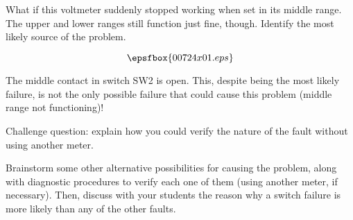 

What if this voltmeter suddenly stopped working when set in its middle range.  The upper and lower ranges still function just fine, though.  Identify the most likely source of the problem.

$$\epsfbox{00724x01.eps}$$







The middle contact in switch SW2 is open.  This, despite being the most likely failure, is not the only possible failure that could cause this problem (middle range not functioning)!

\vskip 10pt

Challenge question: explain how you could verify the nature of the fault without using another meter.







Brainstorm some other alternative possibilities for causing the problem, along with diagnostic procedures to verify each one of them (using another meter, if necessary).  Then, discuss with your students the reason why a switch failure is more likely than any of the other faults.



